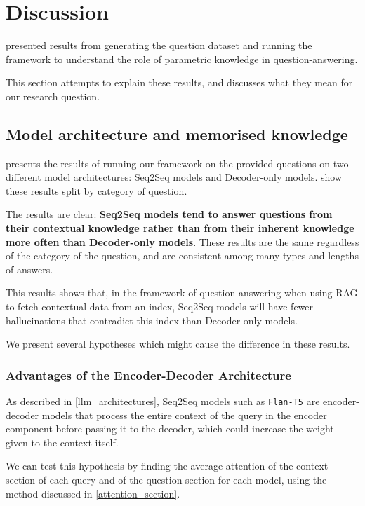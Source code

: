 \section{Discussion}
\label{discussion}

 presented results from generating the question dataset and running the framework to understand the role of parametric knowledge in question-answering.

This section attempts to explain these results, and discusses what they mean for our research question.

\subsection{Model architecture and memorised knowledge}
\label{model_architecture_parametric}

 presents the results of running our framework on the provided questions on two different model architectures: Seq2Seq models and Decoder-only models.
 show these results split by category of question.

The results are clear: \textbf{Seq2Seq models tend to answer questions from their contextual knowledge rather than from their inherent knowledge more often than Decoder-only models}.
These results are the same regardless of the category of the question, and are consistent among many types and lengths of answers.

This results shows that, in the framework of question-answering when using RAG to fetch contextual data from an index, Seq2Seq models will have fewer hallucinations that contradict this index than Decoder-only models.

We present several hypotheses which might cause the difference in these results.

\subsubsection{Advantages of the Encoder-Decoder Architecture}

As described in \cref{llm_architectures}, Seq2Seq models such as \texttt{Flan-T5} are encoder-decoder models that process the entire context of the query in the encoder component before passing it to the decoder, which could increase the weight given to the context itself.

We can test this hypothesis by finding the average attention of the context section of each query and of the question section for each model, using the method discussed in \cref{attention_section}.

